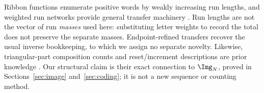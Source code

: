 Ribbon functions enumerate positive words by weakly increasing run lengths,
and weighted run networks provide general transfer machinery
\citep{gessel2019reciprocals,zhuang2016runs,gesselzhuang2019homomorphisms}.
Run lengths are not the vector of run \emph{masses} used here: substituting
letter weights to record the total does not preserve the separate masses.
Endpoint-refined transfers recover the usual inverse bookkeeping, to which
we assign no separate novelty. Likewise, triangular-part composition
counts and reset/increment descriptions are prior knowledge
\citep{wilson1998triangular,robbins2014polygonal}. Our structural claim is
their exact connection to $\Img_N$, proved in Sections~\ref{sec:image}
and~\ref{sec:coding}; it is not a new sequence or counting method.
